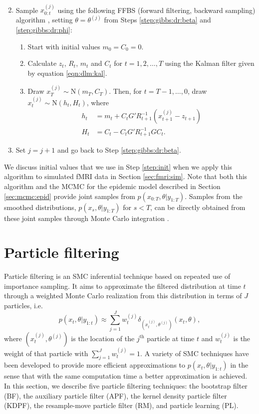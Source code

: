 \begin{enumerate}
\begin{align}
\end{align}
\item \label{step:ffbs} Sample $x_{0:t}^{(j)}$ using the following FFBS (forward filtering, backward sampling) algorithm \cite[Section 4.4][]{petris:camp:2009:dynamic}, setting $\theta = \theta^{(j)}$ from Steps \ref{step:gibbs:dr:beta} and \ref{step:gibbs:dr:phi}:
\begin{enumerate}
\item \label{ffbs:init} Start with initial values $m_0 = C_0 = 0$.
\item \label{ffbs:kal} Calculate $z_t$, $R_t$, $m_t$ and $C_t$ for $t = 1,2,\ldots,T$ using the Kalman filter given by equation \eqref{eqn:dlm:kal}.
\item \label{ffbs:sample} Draw $x_T^{(j)} \sim \mbox{N}(m_T,C_T)$. Then, for $t = T-1,\ldots,0$, draw $x_t^{(j)} \sim \mbox{N}(h_t,H_t)$, where
    \begin{align*}
    h_t &= m_t + C_tG'R_{t+1}^{-1}(x_{t+1}^{(j)} - z_{t+1}) \\
    H_t &= C_t - C_tG'R_{t+1}^{-1}GC_t.
    \end{align*}
\end{enumerate}
\item Set $j = j + 1$ and go back to Step \ref{step:gibbs:dr:beta}.
\end{enumerate}
We discuss initial values that we use in Step \ref{step:init} when we apply this algorithm to simulated fMRI data in Section \ref{sec:fmri:sim}. Note that both this algorithm and the MCMC for the epidemic model described in Section \ref{sec:mcmc:epid} provide joint samples from $p(x_{0:T},\theta|y_{1:T})$. Samples from the smoothed distributions, $p(x_s,\theta|y_{1:T})$ for $s < T$, can be directly obtained from these joint samples through Monte Carlo integration \cite[Chapter 3][]{Robe:Case:mont:2004}.

\section{Particle filtering \label{sec:filtering}}

Particle filtering is an SMC inferential technique based on repeated use of importance sampling. It aims to approximate the filtered distribution at time $t$ through a weighted Monte Carlo realization from this distribution in terms of $J$ particles, i.e.
\begin{equation}
p(x_t,\theta| y_{1:t}) \approx \sum_{j=1}^J w_t^{(j)} \delta_{\left(x_t^{(j)},\theta^{(j)}\right)}(x_t,\theta), \label{eqn:approx}
\end{equation}
where $\left(x_t^{(j)},\theta^{(j)}\right)$ is the location of the $j^{\mbox{th}}$ particle at time $t$ and $w_t^{(j)}$ is the weight of that particle with $\sum_{j=1}^J w_t^{(j)}=1$. A variety of SMC techniques have been developed to provide more efficient approximations to $p(x_t,\theta|y_{1:t})$ in the sense that with the same computation time a better approximation is achieved. In this section, we describe five particle filtering techniques: the bootstrap filter (BF), the auxiliary particle filter (APF), the kernel density particle filter (KDPF), the resample-move particle filter (RM), and particle learning (PL).

